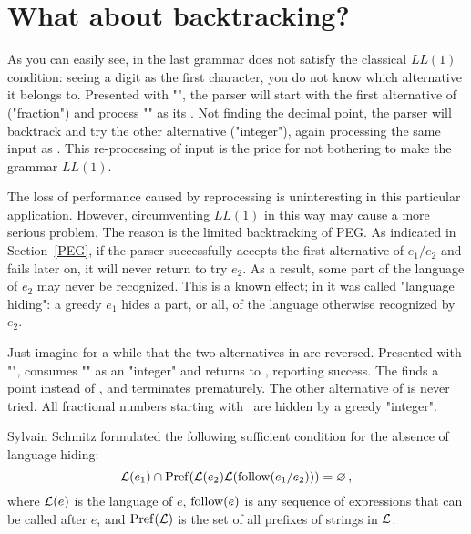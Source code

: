 
\section{What about backtracking?\label{back}}


As you can easily see,  in the last grammar
does not satisfy the classical $LL(1)$ condition:
seeing a digit as the first character,
you do not know which alternative it belongs to.
Presented with "", the parser will start with
the first alternative of  ("fraction")
and process "" as its \Digits. 
Not finding the decimal point, the parser will backtrack and try
the other alternative ("integer"),
again processing the same input as \Digits.
This re-processing of input is the price for not bothering
to make the grammar $LL(1)$.

The loss of performance caused by reprocessing is uninteresting
in this particular application.
However, circumventing $LL(1)$ in this way may cause a more serious problem.
The reason is the limited backtracking of PEG.
As indicated in Section~\ref{PEG}, 
if the parser successfully accepts the first alternative 
of $e_1 / e_2$ and fails later on, 
it will never return to try $e_2$.
As a result, some part of the language of $e_2$ may never be recognized.
This is a known effect; 
in \cite{Redz:2009:FI} it was called "language hiding":
a greedy $e_1$ hides a part, or all, of the language otherwise recognized by $e_2$.

Just imagine for a while that the two alternatives in 
are reversed. 
Presented with "",  consumes "" as an "integer"
and returns to , reporting success.
The  finds a point instead of , 
and terminates prematurely. 
The other alternative of  is never tried.
All fractional numbers starting with \Digits\ are hidden by a greedy "integer".

Sylvain Schmitz \cite{Schmitz:2006} formulated the following sufficient
condition for the absence of language hiding:
%
\begin{equation*}
\mathcal{L}(e_1) \cap \operatorname{Pref}(\mathcal{L}(e_2)\mathcal{L}(\operatorname{follow}(e_1/e_2))) = \varnothing\,,
\end{equation*}
%
where $\mathcal{L}(e)$ is the language of $e$, $\operatorname{follow}(e)$
is any sequence of expressions that can be called after $e$,
and $\operatorname{Pref}(\mathcal{L})$ is the set of all prefixes of strings in $\mathcal{L}$.

